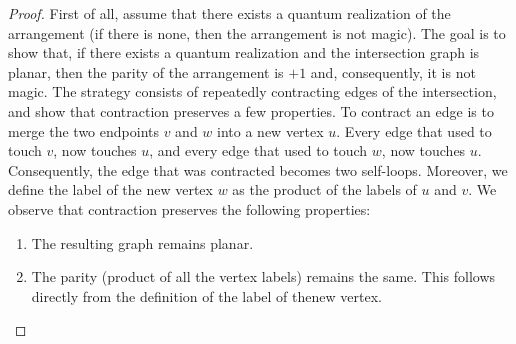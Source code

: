 \documentclass{llncs}
\begin{document}
\begin{proof}
  First of all, assume that there exists a quantum realization of the
  arrangement (if there is none, then the arrangement is not magic).
  The goal is to show that, if there exists a quantum realization and
  the intersection graph is planar, then the parity of the arrangement
  is \(+1\) and, consequently, it is not magic. The strategy consists
  of repeatedly contracting edges of the intersection, and show that
  contraction preserves a few properties. To contract an edge is to
  merge the two endpoints \(v\) and \(w\) into a new vertex
  \(u\). Every edge that used to touch \(v\), now touches \(u\), and
  every edge that used to touch \(w\), now touches
  \(u\). Consequently, the edge that was contracted becomes two
  self-loops. Moreover, we define the label of the new vertex \(w\) as
  the product of the labels of \(u\) and \(v\). We observe that
  contraction preserves the following properties:

  \begin{enumerate}
  \item The resulting graph remains planar.

  \item The parity (product of all the vertex labels) remains the
    same. This follows directly from the definition of the label of
    thenew vertex.


\end{enumerate}
\end{proof}
\end{document}
